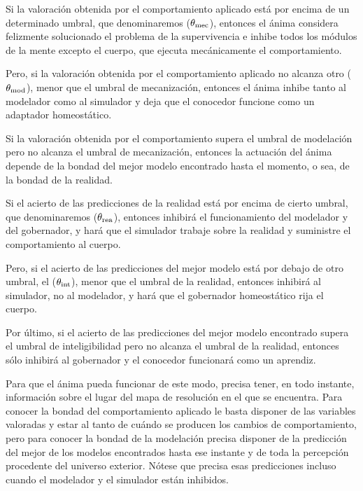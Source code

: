 \bulletedpar \label{mecanización} Si la valoración obtenida por el
comportamiento aplicado está por encima de un determinado umbral, que
denominaremos  ($\theta_{\rm mec}$),
entonces el ánima considera felizmente solucionado el problema de la
supervivencia e inhibe todos los módulos de la mente excepto el cuerpo,
que ejecuta mecánicamente el comportamiento.

\bulletedpar Pero, si la valoración obtenida por el comportamiento
aplicado no alcanza otro 
 ($\theta_{\rm mod}$), menor que el umbral de mecanización, entonces el
ánima inhibe tanto al modelador como al simulador y deja que el conocedor
funcione como un adaptador homeostático.

\bulletedpar Si la valoración obtenida por el comportamiento supera el
umbral de modelación pero no alcanza el umbral de mecanización,
entonces la actuación del ánima depende de la bondad del mejor modelo
encontrado hasta el momento, o sea, de la bondad de la realidad.

\subbulletedpar Si el acierto de las predicciones de la realidad está por
encima de cierto umbral, que denominaremos  ($\theta_{\rm rea}$), entonces inhibirá el funcionamiento del
modelador y del gobernador, y hará que el simulador trabaje sobre la
realidad y suministre el comportamiento al cuerpo.

\goodpage

\subbulletedpar Pero, si el acierto de las predicciones del mejor modelo
está por debajo de otro umbral, el 
($\theta_{\rm int}$), menor que el umbral de la realidad, entonces inhibirá
al simulador, no al modelador, y hará que el gobernador homeostático rija el
cuerpo.

\subbulletedpar Por último, si el acierto de las predicciones del mejor
modelo encontrado supera el umbral de inteligibilidad pero no alcanza el
umbral de la realidad, entonces sólo inhibirá al gobernador y el
conocedor funcionará como un aprendiz.

\smallskip

Para que el ánima pueda funcionar de este modo, precisa tener, en todo
instante, información sobre el lugar del mapa de resolución en el que se
encuentra.  Para conocer la bondad del comportamiento aplicado le basta
disponer de las variables valoradas y estar al tanto de cuándo se producen
los cambios de comportamiento, pero para conocer la bondad de la modelación
precisa disponer de la predicción del mejor de los modelos encontrados hasta
ese instante y de toda la percepción procedente del universo exterior.
Nótese que precisa esas predicciones incluso cuando el modelador y el
simulador están inhibidos.

